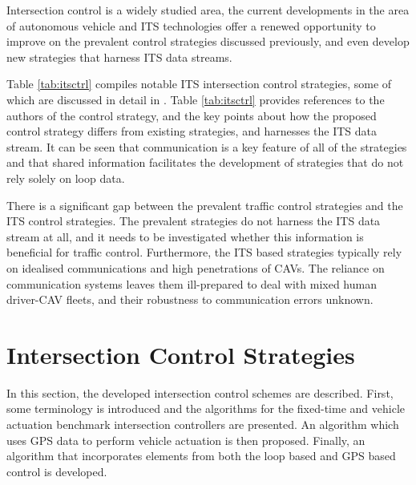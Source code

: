\documentclass[numbered]{trbunofficial}
\begin{document}
Intersection control is a widely studied area, the current developments in the area of autonomous vehicle and ITS technologies offer a renewed opportunity to improve on the prevalent control strategies discussed previously, and even develop new strategies that harness ITS data streams.

Table \ref{tab:itsctrl} compiles notable ITS intersection control strategies, some of which are discussed in detail in \cite{feng2015}. Table \ref{tab:itsctrl} provides references to the authors of the control strategy, and the key points about how the proposed control strategy differs from existing strategies, and harnesses the ITS data stream. It can be seen that communication is a key feature of all of the strategies and that shared information facilitates the development of strategies that do not rely solely on loop data.

There is a significant gap between the prevalent traffic control strategies and the ITS control strategies. The prevalent strategies do not harness the ITS data stream at all, and it needs to be investigated whether this information is beneficial for traffic control. Furthermore, the ITS based strategies typically rely on idealised communications and high penetrations of CAVs. The reliance on communication systems leaves them ill-prepared to deal with mixed human driver-CAV fleets, and their robustness to communication errors unknown. 

\section{Intersection Control Strategies}\label{sec:ctrllog}
In this section, the developed intersection control schemes are described. First, some terminology is introduced and the algorithms for the fixed-time and vehicle actuation benchmark intersection controllers are presented. An algorithm which uses GPS data to perform vehicle actuation is then proposed. Finally, an algorithm that incorporates elements from both the loop based and GPS based control is developed.

\end{document}
